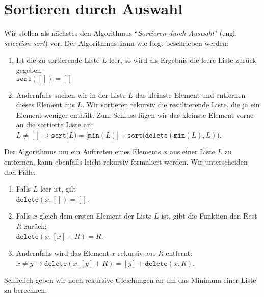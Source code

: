 \section{Sortieren durch Auswahl}
Wir stellen als n\"achstes den Algorithmus ``\emph{Sortieren durch Auswahl}''
(engl. \emph{selection sort}) vor.  Der Algorithmus kann wie folgt beschrieben werden:
\begin{enumerate}
\item Ist die zu sortierende Liste $L$ leer, so wird als Ergebnis
      die leere Liste zur\"uck gegeben: \\[0.1cm]
      \hspace*{1.3cm} $\mathtt{sort}([]) = []$
\item Andernfalls suchen wir in der Liste $L$ das kleinste Element und entfernen dieses
      Element aus $L$.  Wir sortieren rekursiv die resultierende Liste, die ja ein Element
      weniger enth\"alt.  Zum Schluss f\"ugen wir das kleinste Element vorne an die sortierte
      Liste an: \\[0.1cm]
      \hspace*{1.3cm} 
      $L \not= [] \rightarrow \mathtt{sort}\bigl(L\bigr) = \bigl[\texttt{min}(L)\bigr]
      + \mathtt{sort}\bigl(\mathtt{delete}(\texttt{min}(L), L)\bigr)$.
\end{enumerate}
Der Algorithmus um ein Auftreten eines Elements $x$ aus einer Liste $L$ zu entfernen, kann ebenfalls leicht rekursiv
formuliert werden. Wir unterscheiden drei F\"alle:
\begin{enumerate}
\item Falls $L$ leer ist, gilt \\[0.1cm]
      \hspace*{1.3cm} $\mathtt{delete}(x, []) = []$.
\item Falls $x$ gleich dem ersten Element der Liste $L$ ist, gibt die Funktion den Rest
      $R$ zur\"uck: \\[0.1cm]
      \hspace*{1.3cm} 
      $\mathtt{delete}(x, [x] + R) = R$.
\item Andernfalls wird das Element $x$ rekursiv aus $R$ entfernt: \\[0.1cm]
      \hspace*{1.3cm}   
      $x \not = y \rightarrow \mathtt{delete}(x, [y] + R) = [y] + \mathtt{delete}(x,R)$.
\end{enumerate}
Schlie\3lich geben wir noch rekursive Gleichungen an um das Minimum einer Liste zu berechnen:
